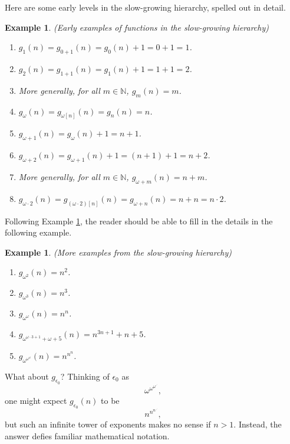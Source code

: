 \documentclass{article}
\newtheorem{example}[theorem]{Example}
\begin{document}
Here are some early levels in the slow-growing hierarchy, spelled out in detail.

\begin{example}
\label{highdetailslowgrowingexample}
    (Early examples of functions in the slow-growing hierarchy)
    \begin{enumerate}
        \item
        $g_1(n)=g_{0+1}(n)=g_0(n)+1=0+1=1$.
        \item
        $g_2(n)=g_{1+1}(n)=g_1(n)+1=1+1=2$.
        \item
        More generally, for all $m\in\mathbb N$,
        $g_m(n)=m$.
        \item
        $g_\omega(n)=g_{\omega[n]}(n)=g_n(n)=n$.
        \item
        $g_{\omega+1}(n)=g_{\omega}(n)+1=n+1$.
        \item
        $g_{\omega+2}(n)=g_{\omega+1}(n)+1=(n+1)+1=n+2$.
        \item
        More generally, for all $m\in\mathbb N$,
        $g_{\omega+m}(n)=n+m$.
        \item
        $g_{\omega\cdot 2}(n)=g_{(\omega\cdot 2)[n]}(n)
        =g_{\omega+n}(n)=n+n=n\cdot 2$.
    \end{enumerate}
\end{example}

Following Example \ref{highdetailslowgrowingexample}, the reader should be able
to fill in the details in the following example.

\begin{example}
    (More examples from the slow-growing hierarchy)
    \begin{enumerate}
        \item
        $g_{\omega^2}(n)=n^2$.
        \item
        $g_{\omega^3}(n)=n^3$.
        \item
        $g_{\omega^\omega}(n)=n^n$.
        \item
        $g_{\omega^{\omega\cdot 3+1}+\omega+5}(n)=n^{3n+1}+n+5$.
        \item
        $g_{\omega^{\omega^{\omega}}}(n)=n^{n^n}$.
    \end{enumerate}
\end{example}

What about $g_{\epsilon_0}$? Thinking of $\epsilon_0$ as
\[\omega^{\omega^{\omega^{\iddots}}},\]
one might expect $g_{\epsilon_0}(n)$ to be
\[n^{n^{n^{\iddots}}},\]
but such an infinite tower
of exponents makes no sense if $n>1$. Instead, the answer defies familiar mathematical
notation.
\end{document}
